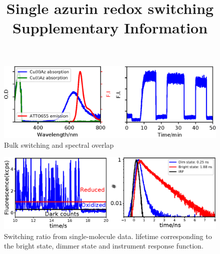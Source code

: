 \documentclass[11pt,a4paper,onecolumn]{article}
\newcommand*{\affaddr}[1]{#1} %
\newcommand*{\email}[1]{\texttt{#1}} %
\begin{document}

\date{\vspace{1ex}} %
\title{\textbf{Single azurin redox switching}\\ \vspace{3ex} Supplementary Information \vspace{3ex}}
\maketitle
\tableofcontents
\pagebreak
\begin{figure}
  \centering
  \includegraphics{Figure_SI/spectral_overlap_switching.eps}
  \makeatletter
  \renewcommand{\fnum@figure}{\figurename~S\thefigure}
  \makeatother
  \caption{Bulk switching and spectral overlap}
  \label{SIfig: switching}
\end{figure}
\begin{figure}
  \centering
  \includegraphics{Figure_SI/lifetime.eps}
  \makeatletter
  \renewcommand{\fnum@figure}{\figurename~S\thefigure}
  \makeatother
  \caption{Switching ratio from single-molecule data. lifetime corresponding to the bright state, dimmer state and instrument response function.}
  \label{SIfig: lifetime}
\end{figure}
\end{document}
